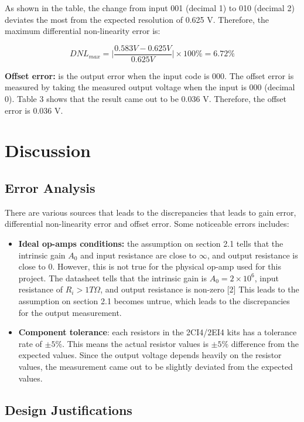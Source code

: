 \documentclass[12pt]{article}
\begin{document}
    As shown in the table, the change from input 001 (decimal 1) to 010 (decimal 2) deviates the most from the expected resolution of 0.625 V. Therefore, the maximum differential non-linearity error is: 

    \[DNL_{max}=\Bigg|\frac{0.583V-0.625V}{0.625V}\Bigg| \times 100\%=\boxed{6.72\%}\]

    \textbf{Offset error:} is the output error when the input code is 000. The offset error is measured by taking the measured output voltage when the input is 000 (decimal 0). Table 3 shows that the result came out to be 0.036 V. Therefore, the offset error is 0.036 V. 
    \newpage
    \section{Discussion}
    

    \subsection{Error Analysis}

    There are various sources that leads to the discrepancies that leads to gain error, differential non-linearity error and offset error. Some noticeable errors includes:

    \begin{itemize}
        \item \textbf{Ideal op-amps conditions:} the assumption on section 2.1 tells that the intrinsic gain \(A_0\) and input resistance are close to \(\infty\), and output resistance is close to 0. However, this is not true for the physical op-amp used for this project. The datasheet tells that the intrinsic gain is \(A_0=2 \times 10^6\), input resistance of \(R_i>1T\Omega\), and output resistance is non-zero [2] This leads to the assumption on section 2.1 becomes untrue, which leads to the discrepancies for the output measurement. 

        \item \textbf{Component tolerance}: each resistors in the 2CI4/2EI4 kits has a tolerance rate of \(\pm 5\%\). This means the actual resistor values is \(\pm 5\%\) difference from the expected values. Since the output voltage depends heavily on the resistor values, the measurement came out to be slightly deviated from the expected values. 
    \end{itemize}

    \subsection{Design Justifications}
\end{document}
